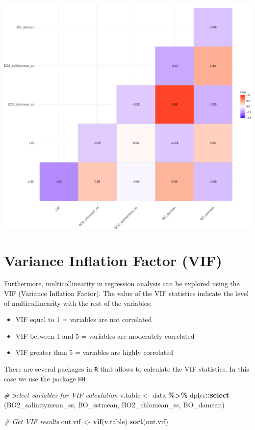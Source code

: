 \documentclass[
]{book}
\newenvironment{Shaded}{\begin{snugshade}}{\end{snugshade}}
\newcommand{\CommentTok}[1]{\textcolor[rgb]{0.56,0.35,0.01}{\textit{#1}}}
\newcommand{\FunctionTok}[1]{\textcolor[rgb]{0.13,0.29,0.53}{\textbf{#1}}}
\newcommand{\NormalTok}[1]{#1}
\newcommand{\OtherTok}[1]{\textcolor[rgb]{0.56,0.35,0.01}{#1}}
\newcommand{\SpecialCharTok}[1]{\textcolor[rgb]{0.81,0.36,0.00}{\textbf{#1}}}
\providecommand{\tightlist}{%
  \setlength{\itemsep}{0pt}\setlength{\parskip}{0pt}}
\begin{document}
\includegraphics{_main_files/figure-latex/unnamed-chunk-51-1.pdf}

\section{Variance Inflation Factor (VIF)}\label{variance-inflation-factor-vif}

Furthermore, multicollinearity in regression analysis can be explored using the VIF (Variance Inflation Factor). The value of the VIF statistics indicate the level of multicollinearity with the rest of the variables:

\begin{itemize}
\tightlist
\item
  VIF equal to 1 = variables are not correlated
\item
  VIF between 1 and 5 = variables are moderately correlated
\item
  VIF greater than 5 = variables are highly correlated
\end{itemize}

There are several packages in \texttt{R} that allows to calculate the VIF statistics. In this case we use the package \texttt{HH}:

\begin{Shaded}
\begin{Highlighting}[]
\CommentTok{\# Select variables for VIF calculation}
\NormalTok{v.table }\OtherTok{\textless{}{-}}\NormalTok{ data }\SpecialCharTok{\%\textgreater{}\%} 
\NormalTok{  dplyr}\SpecialCharTok{::}\FunctionTok{select}\NormalTok{ (BO2\_salinitymean\_ss, BO\_sstmean, BO2\_chlomean\_ss, BO\_damean)}

\CommentTok{\# Get VIF results}
\NormalTok{out.vif }\OtherTok{\textless{}{-}} \FunctionTok{vif}\NormalTok{(v.table)}
\FunctionTok{sort}\NormalTok{(out.vif)}
\end{Highlighting}
\end{Shaded}
\end{document}
